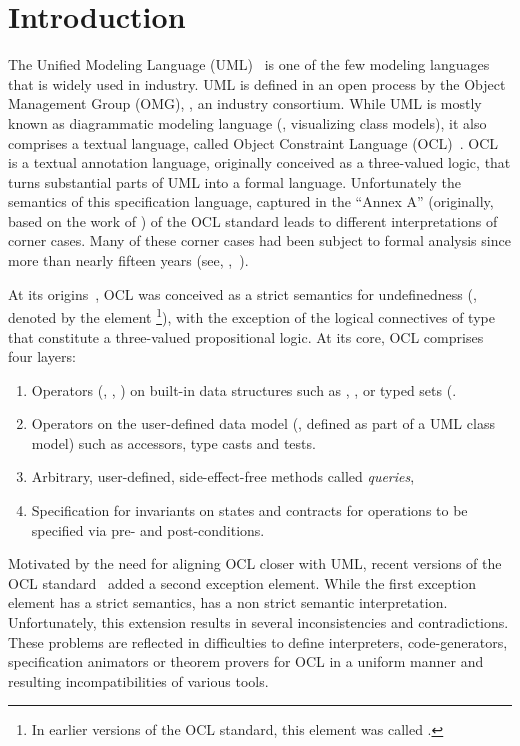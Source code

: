 \section{Introduction}
\isatagafp%
The Unified Modeling Language
(UML)~\cite{omg:uml-infrastructure:2011,omg:uml-superstructure:2011}
is one of the few modeling languages that is widely used in
industry. UML is defined in an open process by the Object Management
Group (OMG), \ie, an industry consortium.  While UML is mostly known
as diagrammatic modeling language (\eg, visualizing class models), it
also comprises a textual language, called Object Constraint Language
(OCL)~\cite{omg:ocl:2012}. OCL is a textual annotation language,
originally conceived as a three-valued logic, that turns substantial
parts of UML into a formal language.  Unfortunately the semantics of
this specification language, captured in the ``Annex A'' (originally,
based on the work of \citet{richters:precise:2002}) of the OCL
standard leads to different interpretations of corner cases.  Many of
these corner cases had been subject to formal analysis since more than
nearly fifteen years (see,
\eg,~\cite{brucker.ea:semantic:2006-b,brucker.ea:proposal:2002,mandel.ea:ocl:1999,
  hamie.ea:reflections:1998,cook.ea::amsterdam:2002}).

At its origins~\cite{richters:precise:2002,omg:ocl:1997}, OCL was
conceived as a strict semantics for undefinedness (\eg, denoted by the
element \footnote{In earlier versions of the OCL
  standard, this element was called .}), with
the exception of the logical connectives of type 
that constitute a three-valued propositional logic. At its core, OCL
comprises four layers:
\begin{enumerate}
\item Operators (\eg, , \inlineocl{_ + _}) on
  built-in data structures such as ,
  , or typed sets (.
\item Operators on the user-defined data model (\eg, defined as part
  of a UML class model) such as accessors, type casts and tests.
\item Arbitrary, user-defined, side-effect-free methods called \emph{queries},
\item Specification for invariants on states and contracts for
  operations to be specified via pre- and post-conditions.
\end{enumerate}

Motivated by the need for aligning OCL closer with UML, recent
versions of the OCL standard~\cite{omg:ocl:2006,omg:ocl:2012} added a
second exception element.  While the first exception element
 has a strict semantics,  has a non
strict semantic interpretation.  Unfortunately, this extension results
in several inconsistencies and contradictions. These problems are
reflected in difficulties to define interpreters, code-generators,
specification animators or theorem provers for OCL in a uniform manner
and resulting incompatibilities of various tools.


